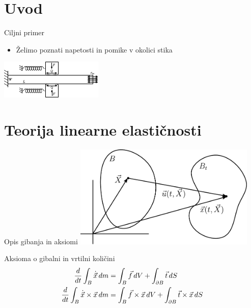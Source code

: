
\section{Uvod}

\begin{frame}{Ciljni primer}
  \begin{itemize}
    \item Želimo poznati napetosti in pomike v okolici stika
  \end{itemize}
  \centering
  \vspace{6ex}
  \includegraphics[width=\textwidth]{resources/fwo_shema.pdf}
\end{frame}

\section{Teorija linearne elastičnosti}

\begin{frame}{Opis gibanja in aksiomi}
  \vspace{0.5ex}
  \centering
  \includegraphics[width=0.65\textwidth]{resources/movement.pdf}
  \vspace{0.5ex}
  \begin{block}{Aksioma o gibalni in vrtilni količini}
    \vspace*{-3.5ex}
  \begin{align*}
    \frac{d}{dt} \int_B \dot{\vec{x}}\, dm &= \int_B \vec{f}\, dV + \int_{\partial B} \vec{t}\, dS
    \\
    \frac{d}{dt} \int_B \dot{\vec{x}} \times \vec{x}\, dm &= \int_B \vec{f} \times \vec{x}\, dV +
    \int_{\partial B} \vec{t} \times \vec{x}\, dS
  \end{align*}
    \vspace*{-2.5ex}
  \end{block}
\end{frame}

